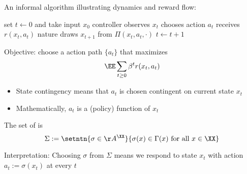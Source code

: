 \begin{frame}
    
    An informal algorithm illustrating dynamics and reward flow:

        \vspace{0.5em}
        \vspace{0.5em}
    \begin{algorithm}[H]
      set $t \leftarrow 0$ and take input $x_0$ \;
      {
          controller observes $x_t$   \;
          chooses action $a_t$    \;
          receives $r(x_t, a_t)$   \;
          nature draws $x_{t+1}$ from $\Pi(x_t, a_t, \cdot)$   \;
          $t  \leftarrow  t + 1$ \;
      }
    \end{algorithm}

\end{frame}




\begin{frame}
    
    Objective: choose a  action path $\{a_t\}$ that maximizes
    \begin{equation*}
        \label{eq:dmdp_ob}
        \EE \sum_{t \geq 0} \beta^t r(x_t, a_t)
    \end{equation*}

    \begin{itemize}
        \item State contingency means that $a_t$ is chosen contingent on current state $x_t$
        \vspace{0.5em}
        \item Mathematically, $a_t$ is a (policy) function of $x_t$
    \end{itemize}

        \vspace{0.5em}
    The set of  is
    \begin{equation*}
        \label{eq:dmdp_fp}
        \Sigma := 
        \setntn{\sigma \in \AA^\XX}{\sigma(x) \in \Gamma(x) \text{ for all } x \in \XX}
    \end{equation*}

    Interpretation: Choosing $\sigma$ from $\Sigma$ means
    we respond to state $x_t$ with action $a_t := \sigma(x_t)$ at every $t$

\end{frame}



